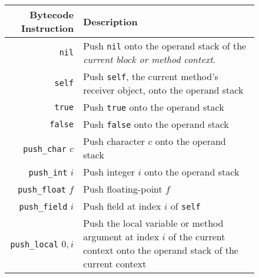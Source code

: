\documentclass[11pt]{article}
\begin{document}
\begin{figure}
\begin{center}
\begin{tabular}[t]{r | l}
{\bf Bytecode Instruction} & {\bf Description} \\
\hline
{\tt nil}  & \begin{minipage}[t]{.76\linewidth}Push {\tt nil} onto the operand stack of the {\em current block or method context}.\end{minipage} \\

{\tt self} & \begin{minipage}[t]{.76\linewidth}Push {\tt self}, the current method's receiver object, onto the operand stack\end{minipage} \\

{\tt true} & \begin{minipage}[t]{.76\linewidth}Push {\tt true} onto the operand stack\end{minipage} \\

{\tt false} & \begin{minipage}[t]{.76\linewidth}Push {\tt false} onto the operand stack\end{minipage} \\

{\tt push\_char} $c$ & \begin{minipage}[t]{.76\linewidth}Push character $c$ onto the operand stack\end{minipage} \\

{\tt push\_int} $i$ & \begin{minipage}[t]{.76\linewidth} Push integer $i$ onto the operand stack\end{minipage} \\ 

{\tt push\_float} $f$ & \begin{minipage}[t]{.76\linewidth} Push floating-point $f$\end{minipage} \\

{\tt push\_field} $i$ & \begin{minipage}[t]{.76\linewidth} Push field at index $i$ of {\tt self}\end{minipage} \\

{\tt push\_local} $0, i$ & \begin{minipage}[t]{.76\linewidth} Push the local variable or method argument at index $i$ of the current context onto the operand stack of the current context\end{minipage} \\


\end{tabular}
\end{center}
\end{figure}
\end{document}
